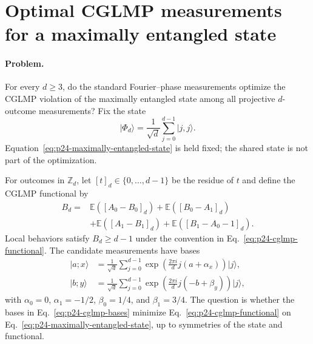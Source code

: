 \section{Optimal CGLMP measurements for a maximally entangled state}
\label{sec:op_ccd560469b815618}

\paragraph{Problem.}
For every $d\geq3$, do the standard Fourier--phase measurements optimize the
CGLMP violation of the maximally entangled state among all projective
$d$-outcome measurements?  Fix the state
\begin{equation}
  \lvert\Phi_d\rangle
  =\frac{1}{\sqrt d}\sum_{j=0}^{d-1}\lvert j,j\rangle.
  \label{eq:p24-maximally-entangled-state}
\end{equation}
Equation~\eqref{eq:p24-maximally-entangled-state} is held fixed; the shared
state is not part of the optimization.

For outcomes in $\mathbb Z_d$, let $[t]_d\in\{0,\ldots,d-1\}$ be the residue
of $t$ and define the CGLMP functional by
\begin{equation}
  \begin{aligned}
    B_d={}&\mathbb E([A_0-B_0]_d)+\mathbb E([B_0-A_1]_d)\\
          &+\mathbb E([A_1-B_1]_d)+\mathbb E([B_1-A_0-1]_d).
  \end{aligned}
  \label{eq:p24-cglmp-functional}
\end{equation}
Local behaviors satisfy $B_d\geq d-1$ under the convention in
Eq.~\eqref{eq:p24-cglmp-functional}.  The candidate measurements have bases
\begin{equation}
  \begin{aligned}
    \lvert a;x\rangle
      &=\frac{1}{\sqrt d}\sum_{j=0}^{d-1}
        \exp\!\left(\frac{2\pi i}{d}j(a+\alpha_x)\right)\lvert j\rangle,\\
    \lvert b;y\rangle
      &=\frac{1}{\sqrt d}\sum_{j=0}^{d-1}
        \exp\!\left(\frac{2\pi i}{d}j(-b+\beta_y)\right)\lvert j\rangle,
  \end{aligned}
  \label{eq:p24-cglmp-bases}
\end{equation}
with $\alpha_0=0$, $\alpha_1=-1/2$, $\beta_0=1/4$, and $\beta_1=3/4$.
The question is whether the bases in Eq.~\eqref{eq:p24-cglmp-bases} minimize
Eq.~\eqref{eq:p24-cglmp-functional} on
Eq.~\eqref{eq:p24-maximally-entangled-state}, up to symmetries of the state
and functional.

